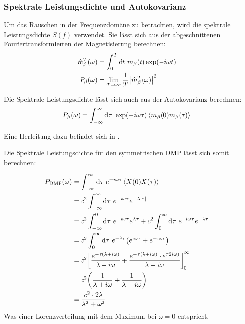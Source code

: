 \documentclass[main.tex]{subfiles}
\begin{document}
\subsubsection*{Spektrale Leistungsdichte und Autokovarianz}

Um das Rauschen in der Frequenzdomäne zu betrachten, wird die spektrale
Leistungsdichte \(S(f)\) verwendet. Sie lässt sich aus der abgeschnittenen
Fouriertransformierten der Magnetisierung berechnen:
\begin{align}
	\hat{m}_\beta^T(\omega) & = \int_0^T \mathrm{d} t \ m_\beta(t) \exp(-i \omega
	t)
	\\
	P_{\beta}(\omega)       & = \lim_{T \to \infty} \frac{1}{T}
	\abs{\hat{m}_\beta^T(\omega)}^2
\end{align}

Die Spektrale Leistungsdichte lässt sich auch aus der Autokovarianz berechnen:
\begin{align}
	P_\beta(\omega) = \int_{-\infty}^{\infty} \mathrm{d} \tau \ \exp(-i \omega
	\tau) \expval{m_\beta(0) m_\beta(\tau)}
\end{align}

Eine Herleitung dazu befindet sich in \cite{schlegel-master}.

Die Spektrale Leistungsdichte für den symmetrischen DMP lässt sich somit berechnen:


\begin{align}
	P_\text{DMP}(\omega) &= \int_{-\infty}^{\infty} \dif \tau \ e^{-i \omega \tau} \expval{X(0)X(\tau)}\\
	&= c^2 \int_{-\infty}^{\infty} \dif \tau \ e^{-i \omega \tau}e^{-\lambda \abs{\tau}}\\
	&= c^2 \int_{-\infty}^{0} \dif \tau \ e^{-i \omega \tau}e^{\lambda \tau} + c^2 \int_{0}^{\infty} \dif \tau \ e^{-i \omega \tau}e^{-\lambda \tau}\\
	&= c^2 \int_{0}^{\infty} \dif \tau \ e^{-\lambda \tau} \qty(e^{i \omega \tau} + e^{-i \omega \tau})\\
	&= c^2 \qty[\frac{e^{-\tau(\lambda + i\omega)}}{\lambda + i\omega} + \frac{e^{-\tau(\lambda + i\omega)}\cdot e^{\tau 2 i \omega)}}{\lambda - i\omega}]_{0}^{\infty}\\
	&= c^2\qty(\frac{1}{\lambda + i\omega} + \frac{1}{\lambda - i\omega})\\
	&= \frac{c^2 \cdot 2\lambda}{\lambda^2 + \omega^2}
\end{align}
Was einer Lorenzverteilung mit dem Maximum bei \(\omega=0\) entspricht.

\end{document}
